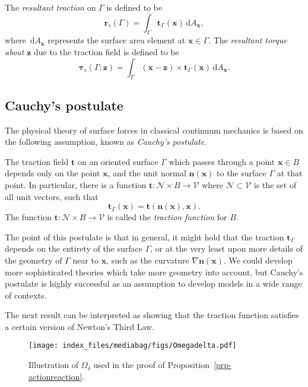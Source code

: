 \documentclass[
  letterpaper,
  DIV=11,
  numbers=noendperiod]{scrreprt}
\theoremstyle{plain}
\theoremstyle{remark}
\begin{document}
The \emph{resultant traction} on \(\Gamma\) is defined to be
\[{\boldsymbol{r}}_s(\Gamma)= \int_\Gamma {\boldsymbol{t}}_\Gamma({\boldsymbol{x}}){\,{\mathrm{d}}A_{{\boldsymbol{x}}}},\]
where \({\,{\mathrm{d}}A_{{\boldsymbol{x}}}}\) represents the surface
area element at \({\boldsymbol{x}}\in\Gamma\). The \emph{resultant
torque about \({\boldsymbol{z}}\)} due to the traction field is defined
to be
\[{\boldsymbol{\tau}}_s(\Gamma;{\boldsymbol{z}})= \int_\Gamma ({\boldsymbol{x}}-{\boldsymbol{z}})\times {\boldsymbol{t}}_\Gamma({\boldsymbol{x}}){\,{\mathrm{d}}A_{{\boldsymbol{x}}}}.\]

\subsection{Cauchy's postulate}\label{cauchys-postulate}

The physical theory of surface forces in classical continuum mechanics
is based on the following assumption, known as \emph{Cauchy's
postulate}.

The traction field \({\boldsymbol{t}}\) on an oriented surface
\(\Gamma\) which passes through a point \({\boldsymbol{x}}\in B\)
depends only on the point \({\boldsymbol{x}}\), and the unit normal
\({\boldsymbol{n}}({\boldsymbol{x}})\) to the surface \(\Gamma\) at that
point. In particular, there is a function
\({\boldsymbol{t}}:{\mathcal{N}}\times B\to{\mathcal{V}}\) where
\({\mathcal{N}}\subset{\mathcal{V}}\) is the set of all unit vectors,
such that
\[{\boldsymbol{t}}_\Gamma({\boldsymbol{x}}) = {\boldsymbol{t}}({\boldsymbol{n}}({\boldsymbol{x}}),{\boldsymbol{x}}).\]
The function \({\boldsymbol{t}}:{\mathcal{N}}\times B\to{\mathcal{V}}\)
is called the \emph{traction function} for \(B\).

The point of this postulate is that in general, it might hold that the
traction \({\boldsymbol{t}}_\Gamma\) depends on the entirety of the
surface \(\Gamma\), or at the very least upon more details of the
geometry of \(\Gamma\) near to \({\boldsymbol{x}}\), such as the
curvature \(\nabla{\boldsymbol{n}}({\boldsymbol{x}})\). We could develop
more sophisticated theories which take more geometry into account, but
Cauchy's postulate is highly successful as an assumption to develop
models in a wide range of contexts.

The next result can be interpreted as showing that the traction function
satisfies a certain version of Newton's Third Law.

\begin{figure}[H]

{\centering \texttt{[image: index\_files/mediabag/figs/Omegadelta.pdf]}

}

\caption{Illustration of \(\Omega_\delta\) used in the proof of
Proposition~\ref{prp-actionreaction}.}

\end{figure}%
\end{document}
